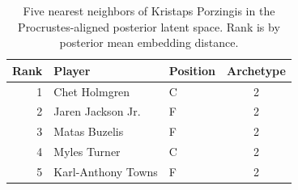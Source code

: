 \begin{table}[htbp]
  \centering\small
  \begin{tabular}{rllc}
    \toprule
    Rank & Player & Position & Archetype \\
    \midrule
    1 & Chet Holmgren & C & 2 \\
    2 & Jaren Jackson Jr. & F & 2 \\
    3 & Matas Buzelis & F & 2 \\
    4 & Myles Turner & C & 2 \\
    5 & Karl-Anthony Towns & F & 2 \\
    \bottomrule
  \end{tabular}
  \caption{Five nearest neighbors of Kristaps Porzingis in the Procrustes-aligned posterior latent space. Rank is by posterior mean embedding distance.}
  \label{tab:Kristaps_Porzingis_neighbors}
\end{table}

